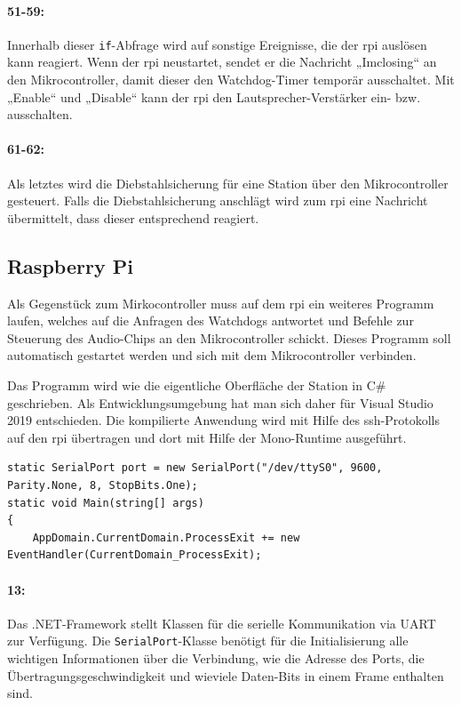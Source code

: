 \paragraph{51-59:}
Innerhalb dieser \texttt{if}-Abfrage wird auf sonstige Ereignisse, die der \ac{rpi} auslösen kann reagiert.
Wenn der \ac{rpi} neustartet, sendet er die Nachricht „Imclosing“ an den Mikrocontroller, damit dieser den Watchdog-Timer temporär ausschaltet.
Mit „Enable“ und „Disable“ kann der \ac{rpi} den Lautsprecher-Verstärker ein- bzw. ausschalten.

\paragraph{61-62:}
Als letztes wird die Diebstahlsicherung für eine Station über den Mikrocontroller gesteuert.
Falls die Diebstahlsicherung anschlägt wird zum \ac{rpi} eine Nachricht übermittelt, dass dieser entsprechend reagiert.

\subsection{Raspberry Pi}
Als Gegenstück zum Mirkocontroller muss auf dem \ac{rpi} ein weiteres Programm laufen, welches auf die Anfragen des Watchdogs antwortet und Befehle zur Steuerung des Audio-Chips an den Mikrocontroller schickt.
Dieses Programm soll automatisch gestartet werden und sich mit dem Mikrocontroller verbinden.\par

Das Programm wird wie die eigentliche Oberfläche der Station in C\# geschrieben.
Als Entwicklungsumgebung hat man sich daher für Visual Studio 2019 entschieden.
Die kompilierte Anwendung wird mit Hilfe des \ac{ssh}-Protokolls auf den \ac{rpi} übertragen und dort mit Hilfe der Mono-Runtime ausgeführt.

\begin{verbatim}
static SerialPort port = new SerialPort("/dev/ttyS0", 9600, Parity.None, 8, StopBits.One);
static void Main(string[] args)
{
    AppDomain.CurrentDomain.ProcessExit += new EventHandler(CurrentDomain_ProcessExit);
\end{verbatim}

\paragraph{13:}
Das .NET-Framework stellt Klassen für die serielle Kommunikation via UART zur Verfügung.
Die \texttt{SerialPort}-Klasse benötigt für die Initialisierung alle wichtigen Informationen über die Verbindung, wie die Adresse des Ports, die Übertragungsgeschwindigkeit und wieviele Daten-Bits in einem Frame enthalten sind.

